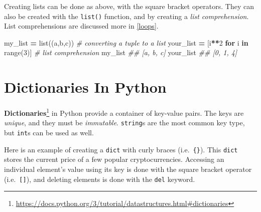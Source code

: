 \documentclass[
  12pt,
  krantz2]{krantz}
\makeatletter
\newenvironment{Shaded}{\begin{snugshade}}{\end{snugshade}}
\newcommand{\BuiltInTok}[1]{#1}
\newcommand{\CommentTok}[1]{\textcolor[rgb]{0.37,0.37,0.37}{\textit{#1}}}
\newcommand{\ControlFlowTok}[1]{\textcolor[rgb]{0.27,0.27,0.27}{\textbf{#1}}}
\newcommand{\DecValTok}[1]{\textcolor[rgb]{0.06,0.06,0.06}{#1}}
\newcommand{\KeywordTok}[1]{\textcolor[rgb]{0.27,0.27,0.27}{\textbf{#1}}}
\newcommand{\NormalTok}[1]{#1}
\newcommand{\OperatorTok}[1]{\textcolor[rgb]{0.43,0.43,0.43}{\textbf{#1}}}
\newcommand{\StringTok}[1]{\textcolor[rgb]{0.5,0.5,0.5}{#1}}
\renewcommand{\href}[2]{#2\footnote{\url{#1}}}
\newenvironment{kframe}{%
\medskip{}
\setlength{\fboxsep}{.8em}
 \def\at@end@of@kframe{}%
 \ifinner\ifhmode%
  \def\at@end@of@kframe{\end{minipage}}%
  \begin{minipage}{\columnwidth}%
 \fi\fi%
 \def\FrameCommand##1{\hskip\@totalleftmargin \hskip-\fboxsep
 \colorbox{shadecolor}{##1}\hskip-\fboxsep
     \hskip-\linewidth \hskip-\@totalleftmargin \hskip\columnwidth}%
 \MakeFramed {\advance\hsize-\width
   \@totalleftmargin\z@ \linewidth\hsize
   \@setminipage}}%
 {\par\unskip\endMakeFramed%
 \at@end@of@kframe}
\renewenvironment{Shaded}{\begin{kframe}}{\end{kframe}}
\makeatother
\begin{document}
Creating lists can be done as above, with the square bracket operators. They can also be created with the \texttt{list()} function, and by creating a \emph{list comprehension}. List comprehensions are discussed more in \ref{loops}.

\begin{Shaded}
\begin{Highlighting}[]
\NormalTok{my\_list }\OperatorTok{=} \BuiltInTok{list}\NormalTok{((}\StringTok{\textquotesingle{}a\textquotesingle{}}\NormalTok{,}\StringTok{\textquotesingle{}b\textquotesingle{}}\NormalTok{,}\StringTok{\textquotesingle{}c\textquotesingle{}}\NormalTok{)) }\CommentTok{\# converting a tuple to a list}
\NormalTok{your\_list }\OperatorTok{=}\NormalTok{ [i}\OperatorTok{**}\DecValTok{2} \ControlFlowTok{for}\NormalTok{ i }\KeywordTok{in} \BuiltInTok{range}\NormalTok{(}\DecValTok{3}\NormalTok{)] }\CommentTok{\# list comprehension}
\NormalTok{my\_list}
\CommentTok{\#\# [\textquotesingle{}a\textquotesingle{}, \textquotesingle{}b\textquotesingle{}, \textquotesingle{}c\textquotesingle{}]}
\NormalTok{your\_list}
\CommentTok{\#\# [0, 1, 4]}
\end{Highlighting}
\end{Shaded}

\hypertarget{dictionaries-in-python}{%
\section{Dictionaries In Python}\label{dictionaries-in-python}}

\href{https://docs.python.org/3/tutorial/datastructures.html\#dictionaries}{\textbf{Dictionaries}} in Python provide a container of key-value pairs. The keys are \emph{unique}, and they must be \emph{immutable}. \texttt{string}s are the most common key type, but \texttt{int}s can be used as well.

Here is an example of creating a \texttt{dict} with curly braces (i.e.~\texttt{\{\}}). This \texttt{dict} stores the current price of a few popular cryptocurrencies. Accessing an individual element's value using its key is done with the square bracket operator (i.e.~\texttt{{[}{]}}), and deleting elements is done with the \texttt{del} keyword.
\end{document}
